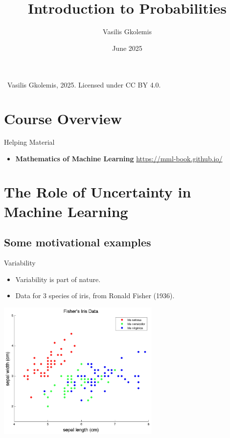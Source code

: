 \documentclass{beamer}
\title{Introduction to Probabilities}
\author{Vasilis Gkolemis}
\institute{ATHENA RC | HUA}
\date{June 2025}
\begin{document}
\begin{frame}
  \titlepage
  \vfill
  \footnotesize
  \textcopyright\
  Vasilis Gkolemis, 2025. Licensed under CC BY 4.0.
\end{frame}

\section{Course Overview}




\begin{frame}{Helping Material}
  \begin{itemize}
    \item \textbf{Mathematics of Machine Learning} \url{https://mml-book.github.io/}
  \end{itemize}
\end{frame}


\section{The Role of Uncertainty in Machine Learning}

\subsection{Some motivational examples}

\begin{frame}{Variability}
\begin{itemize}
  \item Variability is part of nature.
  \item Data for 3 species of iris, from Ronald Fisher (1936).
\end{itemize}
\begin{center}
  \includegraphics[width=0.6\textwidth]{iris_data.png}
\end{center}
\end{frame}
\end{document}
